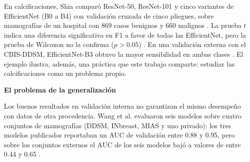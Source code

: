 En calcificaciones, Shia comparó ResNet-50, ResNet-101 y cinco variantes de EfficientNet (B0 a B4) con validación cruzada de cinco pliegues, sobre mamografías de un hospital con 869 casos benignos y 660 malignos \cite{Shia2025MicrocalcClassification}.
La prueba $t$ indica una diferencia significativa en F1 a favor de todas las EfficientNet, pero la prueba de Wilcoxon no la confirma ($p > 0.05$) \cite{Shia2025MicrocalcClassification}.
En una validación externa con el CBIS-DDSM, EfficientNet-B3 obtuvo la mayor sensibilidad en ambas clases \cite{Shia2025MicrocalcClassification}. El ejemplo ilustra, además, una práctica que este trabajo comparte: estudiar las calcificaciones como un problema propio.

\textbf{El problema de la generalización}

Los buenos resultados en validación interna no garantizan el mismo desempeño con datos de otra procedencia. Wang et al. evaluaron seis modelos sobre cuatro conjuntos de mamografías (DDSM, INbreast, MIAS y uno privado): los tres modelos publicados reportaban un AUC de validación entre 0.88 y 0.95, pero sobre los conjuntos externos el AUC de los seis modelos bajó a valores de entre 0.44 y 0.65 \cite{Wang2020DeepLearning}.

